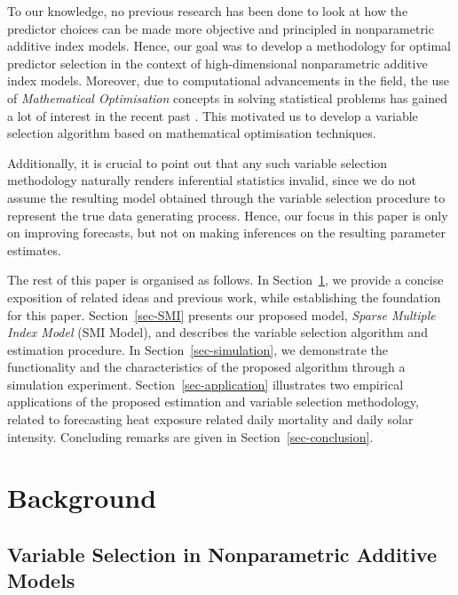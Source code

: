 \documentclass[11pt,a4paper,]{article}
\begin{document}
To our knowledge, no previous research has been done to look at how the
predictor choices can be made more objective and principled in
nonparametric additive index models. Hence, our goal was to develop a
methodology for optimal predictor selection in the context of
high-dimensional nonparametric additive index models. Moreover, due to
computational advancements in the field, the use of \emph{Mathematical
Optimisation} concepts in solving statistical problems has gained a lot
of interest in the recent past \autocite{Theusl2020}. This motivated us
to develop a variable selection algorithm based on mathematical
optimisation techniques.

Additionally, it is crucial to point out that any such variable
selection methodology naturally renders inferential statistics invalid,
since we do not assume the resulting model obtained through the variable
selection procedure to represent the true data generating process.
Hence, our focus in this paper is only on improving forecasts, but not
on making inferences on the resulting parameter estimates.

The rest of this paper is organised as follows. In
Section~\ref{sec-background}, we provide a concise exposition of related
ideas and previous work, while establishing the foundation for this
paper. Section~\ref{sec-SMI} presents our proposed model, \emph{Sparse
Multiple Index Model} (SMI Model), and describes the variable selection
algorithm and estimation procedure. In Section~\ref{sec-simulation}, we
demonstrate the functionality and the characteristics of the proposed
algorithm through a simulation experiment. Section~\ref{sec-application}
illustrates two empirical applications of the proposed estimation and
variable selection methodology, related to forecasting heat exposure
related daily mortality and daily solar intensity. Concluding remarks
are given in Section~\ref{sec-conclusion}.

\hypertarget{sec-background}{%
\section{Background}\label{sec-background}}

\hypertarget{variable-selection-in-nonparametric-additive-models}{%
\subsection{Variable Selection in Nonparametric Additive
Models}\label{variable-selection-in-nonparametric-additive-models}}
\end{document}
